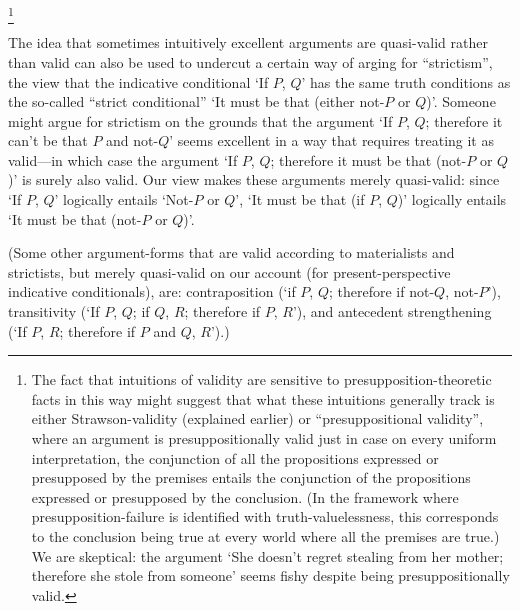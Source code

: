 \documentclass[If.tex]{subfiles}
\begin{document}
\footnote{The fact that intuitions of validity are sensitive to presupposition-theoretic facts in this way might suggest that what these intuitions generally track is either Strawson-validity (explained earlier) or “presuppositional validity”, where an argument is presuppositionally valid just in case on every uniform interpretation, the conjunction of all the propositions expressed or presupposed by the premises entails the conjunction of the propositions expressed or presupposed by the conclusion.  (In the framework where presupposition-failure is identified with truth-valuelessness, this corresponds to the conclusion being true at every world where all the premises are true.)  We are skeptical: the argument ‘She doesn't regret stealing from her mother; therefore she stole from someone’ seems fishy despite being presuppositionally valid.}  


The idea that sometimes intuitively excellent arguments are quasi-valid rather than valid can also be used to undercut a certain way of arging for “strictism”, the view that the indicative conditional ‘If $P$, $Q$’ has the same truth conditions as the so-called “strict conditional” ‘It must be that (either not-$P$ or $Q$)’.  Someone might argue for strictism on the grounds that the argument ‘If $P$, $Q$; therefore it can't be that $P$ and not-$Q$’ seems excellent in a way that requires treating it as valid---in which case the argument ‘If $P$, $Q$; therefore it must be that (not-$P$ or $Q$)’ is surely also valid.  Our view makes these arguments merely quasi-valid: since ‘If $P$, $Q$’ logically entails ‘Not-$P$ or $Q$’, ‘It must be that (if $P$, $Q$)’ logically entails ‘It must be that (not-$P$ or $Q$)’.

(Some other argument-forms that are valid according to materialists and strictists, but merely quasi-valid on our account (for present-perspective indicative conditionals), are: contraposition (‘if $P$, $Q$; therefore if not-$Q$, not-$P$’), transitivity (‘If $P$, $Q$; if $Q$, $R$; therefore if $P$, $R$’), and antecedent strengthening (‘If $P$, $R$; therefore if $P$ and $Q$, $R$’).)
\end{document}
